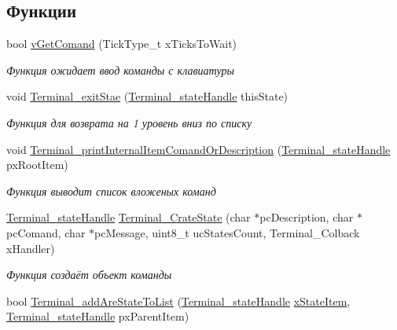 \subsection*{Функции}
\begin{DoxyCompactItemize}
\item 
bool \mbox{\hyperlink{group__terminal_gac9891fc8397e8a100f20698722ab1e71}{v\+Get\+Comand}} (Tick\+Type\+\_\+t x\+Ticks\+To\+Wait)
\begin{DoxyCompactList}\small\item\em Функция ожидает ввод команды с клавиатуры \end{DoxyCompactList}\item 
void \mbox{\hyperlink{group__terminal_ga5ba2d01659937984488cb072a40fe320}{Terminal\+\_\+exit\+Stae}} (\mbox{\hyperlink{group__terminal_gadcd4acb437149111c071e40bccbac72a}{Terminal\+\_\+state\+Handle}} this\+State)
\begin{DoxyCompactList}\small\item\em Функция для возврата на 1 уровень вниз по списку \end{DoxyCompactList}\item 
void \mbox{\hyperlink{group__terminal_gab3311fb037407fc4553f30a8122f2dc3}{Terminal\+\_\+print\+Internal\+Item\+Comand\+Or\+Description}} (\mbox{\hyperlink{group__terminal_gadcd4acb437149111c071e40bccbac72a}{Terminal\+\_\+state\+Handle}} px\+Root\+Item)
\begin{DoxyCompactList}\small\item\em Функция выводит список вложеных команд \end{DoxyCompactList}\item 
\mbox{\hyperlink{group__terminal_gadcd4acb437149111c071e40bccbac72a}{Terminal\+\_\+state\+Handle}} \mbox{\hyperlink{group__terminal_ga41d80f135933b7877905ebb785c0014b}{Terminal\+\_\+\+Crate\+State}} (char $\ast$pc\+Description, char $\ast$pc\+Comand, char $\ast$pc\+Message, uint8\+\_\+t uc\+States\+Count, Terminal\+\_\+\+Colback x\+Handler)
\begin{DoxyCompactList}\small\item\em Функция создаёт объект команды \end{DoxyCompactList}\item 
bool \mbox{\hyperlink{group__terminal_ga7fde78408fabbc2c2790850003202044}{Terminal\+\_\+add\+Are\+State\+To\+List}} (\mbox{\hyperlink{group__terminal_gadcd4acb437149111c071e40bccbac72a}{Terminal\+\_\+state\+Handle}} \mbox{\hyperlink{terminal_8c_ae24b34035b22614977faf32d842e9a97}{x\+State\+Item}}, \mbox{\hyperlink{group__terminal_gadcd4acb437149111c071e40bccbac72a}{Terminal\+\_\+state\+Handle}} px\+Parent\+Item)

\end{DoxyCompactItemize}
